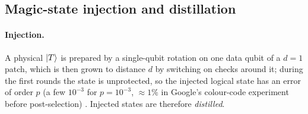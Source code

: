 \subsection{Magic-state injection and distillation}\label{sec:magic}\label{sec:distillation}
\paragraph{Injection.} A physical $\lvert T \rangle$ is prepared by a single-qubit rotation on one data qubit of a $d=1$ patch, which is then grown to distance $d$ by switching on checks around it; during the first rounds the state is unprotected, so the injected logical state has an error of order $p$ (a few $10^{-3}$ for $p=10^{-3}$, $\approx1\%$ in Google's colour-code experiment before post-selection) \cite{lacroix24color}. Injected states are therefore \emph{distilled}.

